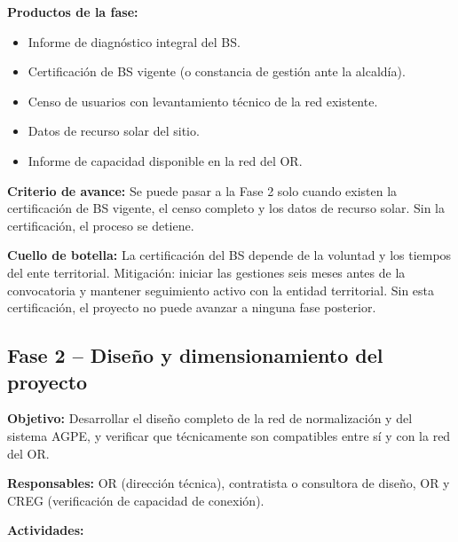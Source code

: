 \textbf{Productos de la fase:}
\begin{itemize}
    \item Informe de diagnóstico integral del BS.
    \item Certificación de BS vigente (o constancia de gestión ante la
    alcaldía).
    \item Censo de usuarios con levantamiento técnico de la red existente.
    \item Datos de recurso solar del sitio.
    \item Informe de capacidad disponible en la red del OR.
\end{itemize}

\textbf{Criterio de avance:} Se puede pasar a la Fase 2 solo cuando
existen la certificación de BS vigente, el censo completo y los datos
de recurso solar. Sin la certificación, el proceso se detiene.

\textbf{Cuello de botella:} La certificación del BS depende de la
voluntad y los tiempos del ente territorial. Mitigación: iniciar las
gestiones seis meses antes de la convocatoria y mantener seguimiento
activo con la entidad territorial. Sin esta certificación, el proyecto
no puede avanzar a ninguna fase posterior.

\subsection{Fase 2 -- Diseño y dimensionamiento del proyecto}
\label{subsec:fase2}

\textbf{Objetivo:} Desarrollar el diseño completo de la red de
normalización y del sistema AGPE, y verificar que técnicamente son
compatibles entre sí y con la red del OR.

\textbf{Responsables:} OR (dirección técnica), contratista o consultora
de diseño, OR y CREG (verificación de capacidad de conexión).

\textbf{Actividades:}

